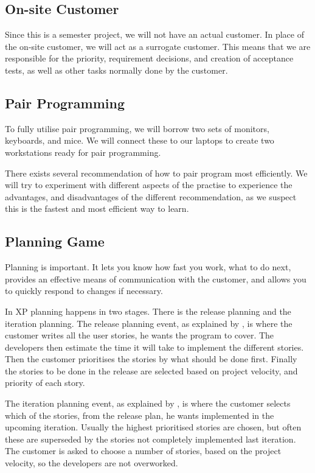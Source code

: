 \subsection{On-site Customer}
\label{def:onsitecustomer}
Since this is a semester project, we will not have an actual customer.
In place of the on-site customer, we will act as a surrogate customer.
This means that we are responsible for the priority, requirement decisions, and creation of acceptance tests, as well as other tasks normally done by the customer.

\subsection{Pair Programming}
\label{def:pairprogramming}
To fully utilise pair programming, we will borrow two sets of monitors, keyboards, and mice.
We will connect these to our laptops to create two workstations ready for pair programming.

There exists several recommendation of how to pair program most efficiently. 
We will try to experiment with different aspects of the practise to experience the advantages, and disadvantages of the different recommendation, as we suspect this is the fastest and most efficient way to learn.

\subsection{Planning Game}
\label{def:planninggame}
Planning is important. It lets you know how fast you work, what to do next, provides an effective means of communication with the customer, and allows you to quickly respond to changes if necessary.

In XP planning happens in two stages. There is the release planning and the iteration planning.
The release planning event, as explained by \citet[p. 40]{xp:planning}, is where the customer writes all the user stories, he wants the program to cover.
The developers then estimate the time it will take to implement the different stories.
Then the customer prioritises the stories by what should be done first.
Finally the stories to be done in the release are selected based on project velocity, and priority of each story.

The iteration planning event, as explained by \citet[Iteration Planning]{xp:online}, is where the customer selects which of the stories, from the release plan, he wants implemented in the upcoming iteration.
Usually the highest prioritised stories are chosen, but often these are superseded by the stories not completely implemented last iteration.
The customer is asked to choose a number of stories, based on the project velocity, so the developers are not overworked.

